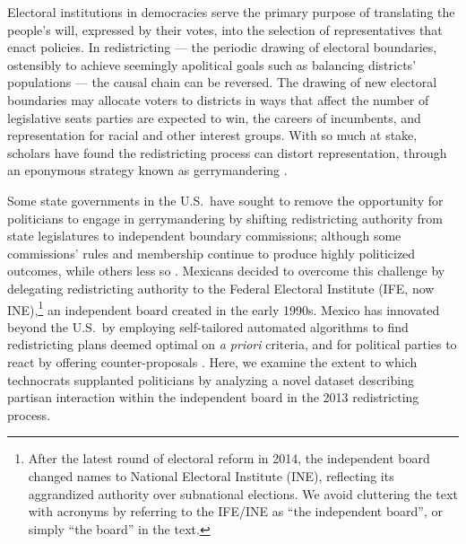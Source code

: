 \documentclass[letter,12pt]{article}
\begin{document}

\onehalfspacing

Electoral institutions in democracies serve the primary purpose of translating the people's will, expressed by their votes, into the selection of representatives that enact policies. In redistricting --- the periodic drawing of electoral boundaries, ostensibly to achieve seemingly apolitical goals such as balancing districts' populations --- the causal chain can be reversed. The drawing of new electoral boundaries may allocate voters to districts in ways that affect the number of legislative seats parties are expected to win, the careers of incumbents, and representation for racial and other interest groups. With so much at stake, scholars have found the redistricting process can distort representation, through an eponymous strategy known as gerrymandering \citep{mayhew1974vanishingMg,cox.katz.2002,erikson1972malapportionment,engstrom2006redisttrictApsr}. 

Some state governments in the U.S.\ have sought to remove the opportunity for politicians to engage in gerrymandering by shifting redistricting authority from state legislatures to independent boundary commissions; although some commissions' rules and membership continue to produce highly politicized outcomes, while others less so \citep{mcdonald.CommVsLegisRedistrict2004,trelles.mtz.polygob2012}. Mexicans decided to overcome this challenge by delegating redistricting authority to the Federal Electoral Institute (IFE, now INE),\footnote{After the latest round of electoral reform in 2014, the independent board changed names to National Electoral Institute (INE), reflecting its aggrandized authority over subnational elections. We avoid cluttering the text with acronyms by referring to the IFE/INE as ``the independent board'', or simply ``the board'' in the text.} an independent board created in the early 1990s. Mexico has innovated beyond the U.S.\ by employing self-tailored automated algorithms to find redistricting plans deemed optimal on \emph{a priori} criteria, and for political parties to react by offering counter-proposals \citep{trelles.mtz.polygob2012}. Here, we examine the extent to which technocrats supplanted politicians \citep{lujambio.vives.2008} by analyzing a novel dataset describing partisan interaction within the independent board in the 2013 redistricting process.
\end{document}
